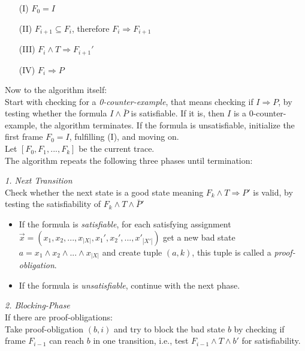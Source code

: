 \documentclass[11pt, a4paper, BCOR=10mm, ngerman, oneside]{scrbook}
\begin{document}
\begin{itemize}
\item[(I)] $F_0 = I$
\item[(II)] $F_{i+1} \subseteq F_{i}$, therefore $F_i \Rightarrow F_{i+1}$
\item[(III)] $F_i \land T \Rightarrow F_{i+1}'$
\item[(IV)] $F_i \Rightarrow P$
\end{itemize}

Now to the algorithm itself: \\
Start with checking for a \textsl{0-counter-example}, that means checking if $I \Rightarrow P$, by testing whether the formula $I \land \bar P$ is satisfiable. If it is, then $I$ is a 0-counter-example, the algorithm terminates.
If the formula is unsatisfiable, initialize the first frame $F_0 = I$, fulfilling (I), and moving on. \\

Let $[F_0, F_1, ..., F_k]$ be the current trace. \\ 
The algorithm repeats the following three phases until termination: \par

\textsl{1. Next Transition} \\ Check whether the next state is a good state meaning $F_k \land T \Rightarrow P'$ is valid, by testing the satisfiability of $F_k \land T \land \bar P'$ 
\begin{itemize}
\item If the formula is \textsl{satisfiable}, for each satisfying assignment \\ $\vec{x} = (x_1, x_2, ..., x_{|X|}, x_1', x_2', ..., x'_{|X'|})$ get a new bad state \\ $a = x_1 \land x_2 \land ... \land x_{|X|}$ and create tuple $(a, k)$, this tuple is called a \textsl{proof-obligation}.

\item If the formula is \textsl{unsatisfiable}, continue with the next phase. \\

\end{itemize}


\textsl{2. Blocking-Phase} \\If there are proof-obligations: \\ 
Take proof-obligation $(b, i)$ and try to block the bad state $b$ by checking if frame $F_{i-1}$ can reach $b$ in one transition, i.e., test $F_{i-1} \land T \land b'$ for satisfiability.
\end{document}
